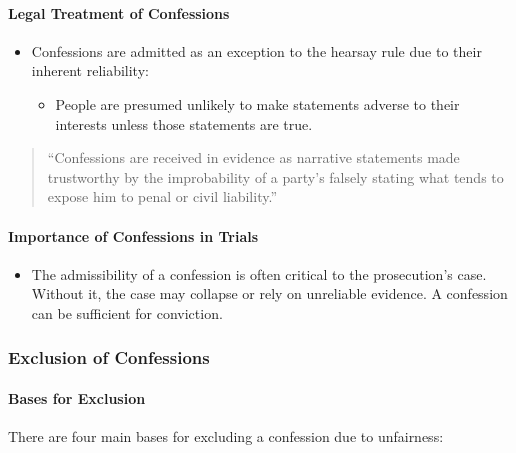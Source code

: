 \paragraph{Legal Treatment of
Confessions}\label{legal-treatment-of-confessions}

\begin{itemize}
\tightlist
\item
  Confessions are admitted as an exception to the hearsay rule due to
  their inherent reliability:

  \begin{itemize}
  \tightlist
  \item
    People are presumed unlikely to make statements adverse to their
    interests unless those statements are true.
  \end{itemize}
\end{itemize}

\begin{quote}
``Confessions are received in evidence as narrative statements made
trustworthy by the improbability of a party's falsely stating what tends
to expose him to penal or civil liability.''
\end{quote}

\paragraph{Importance of Confessions in
Trials}\label{importance-of-confessions-in-trials}

\begin{itemize}
\tightlist
\item
  The admissibility of a confession is often critical to the
  prosecution's case. Without it, the case may collapse or rely on
  unreliable evidence. A confession can be sufficient for conviction.
\end{itemize}

\subsubsection{Exclusion of Confessions}\label{exclusion-of-confessions}

\paragraph{Bases for Exclusion}\label{bases-for-exclusion}

There are four main bases for excluding a confession due to unfairness:

